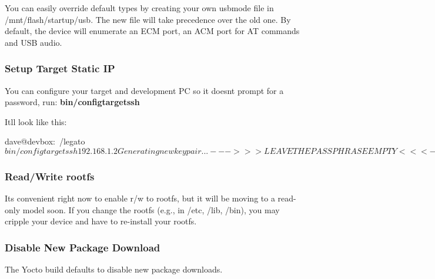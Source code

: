 You can easily override default types by creating your own {\ttfamily usbmode} file in {\ttfamily /mnt/flash/startup/usb}. The new file will take precedence over the old one. By default, the device will enumerate an E\+C\+M port, an A\+C\+M port for A\+T commands and U\+S\+B audio.\hypertarget{yocto_install_notes_getstartedInstallNotes_yoctoStaticIP}{}\subsubsection{Setup Target Static I\+P}\label{yocto_install_notes_getstartedInstallNotes_yoctoStaticIP}
You can configure your target and development P\+C so it doesn\textquotesingle{}t prompt for a password, run\+: {\bfseries bin/configtargetssh} 

It\textquotesingle{}ll look like this\+: \begin{DoxyVerb}dave@devbox:~/legato$ bin/configtargetssh 192.168.1.2
Generating new key pair... --->>> LEAVE THE PASSPHRASE EMPTY <<<---
Generating public/private rsa key pair.
Enter passphrase (empty for no passphrase):
Enter same passphrase again:
Your identification has been saved in /home/dave/.ssh/id_rsa.legatoTarget.
Your public key has been saved in /home/dave/.ssh/id_rsa.legatoTarget.pub.
The key fingerprint is:
af:c5:e4:8c:7d:53:b4:a4:72:c8:67:f3:88:9c:3f:67 dave's key for Legato
target devices.
The key's randomart image is:
+--[ RSA 2048]----+
|                 |
|                 |
|              o  |
|         . . + . |
|        S = * o  |
|         X B =   |
|        . @ + .  |
|         o o..E  |
|        .   .+   |
+-----------------+
/home/dave/.ssh/known_hosts updated.
Original contents retained as /home/dave/.ssh/known_hosts.old
Connecting to the target...  (ENTER TARGET'S ROOT PASSWORD WHENEVER
PROMPTED FOR A PASSWORD)
(press ENTER if your target doesn't have a root password)
The authenticity of host '192.168.1.2 (192.168.1.2)' can't be established.
RSA key fingerprint is f2:2f:66:a5:14:20:bd:46:8f:a2:02:b3:99:6f:72:24.
Are you sure you want to continue connecting (yes/no)? yes
Warning: Permanently added '192.168.1.2' (RSA) to the list of known hosts.
root@192.168.1.2's password:
dave@devpc:~/legato$
\end{DoxyVerb}
\hypertarget{yocto_install_notes_getstartedInstallNotes_yoctoReadWrite}{}\subsubsection{Read/\+Write rootfs}\label{yocto_install_notes_getstartedInstallNotes_yoctoReadWrite}
It\textquotesingle{}s convenient right now to enable r/w to rootfs, but it will be moving to a read-\/only model soon. If you change the rootfs (e.\+g., in /etc, /lib, /bin), you may cripple your device and have to re-\/install your rootfs.\hypertarget{yocto_install_notes_getstartedInstallNotes_yoctoNoDown}{}\subsubsection{Disable New Package Download}\label{yocto_install_notes_getstartedInstallNotes_yoctoNoDown}
The Yocto build defaults to disable new package downloads.

